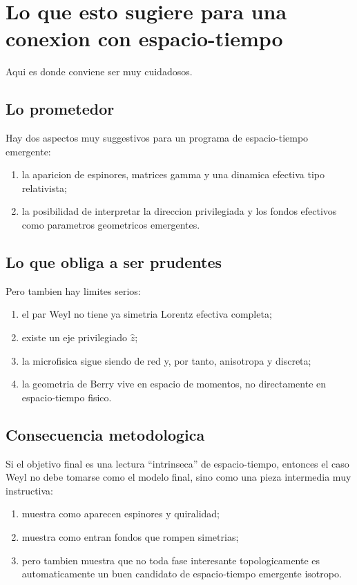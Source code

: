 \section{Lo que esto sugiere para una conexion con espacio-tiempo}
Aqui es donde conviene ser muy cuidadosos.

\subsection{Lo prometedor}
Hay dos aspectos muy suggestivos para un programa de espacio-tiempo emergente:
\begin{enumerate}[label=\arabic*.]
    \item la aparicion de espinores, matrices gamma y una dinamica efectiva tipo relativista;
    \item la posibilidad de interpretar la direccion privilegiada y los fondos efectivos como parametros geometricos emergentes.
\end{enumerate}

\subsection{Lo que obliga a ser prudentes}
Pero tambien hay limites serios:
\begin{enumerate}[label=\arabic*.]
    \item el par Weyl no tiene ya simetria Lorentz efectiva completa;
    \item existe un eje privilegiado \(\hat{z}\);
    \item la microfisica sigue siendo de red y, por tanto, anisotropa y discreta;
    \item la geometria de Berry vive en espacio de momentos, no directamente en espacio-tiempo fisico.
\end{enumerate}

\subsection{Consecuencia metodologica}
Si el objetivo final es una lectura \enquote{intrinseca} de espacio-tiempo, entonces el caso Weyl no debe tomarse como el modelo final, sino como una pieza intermedia muy instructiva:
\begin{enumerate}[label=\arabic*.]
    \item muestra como aparecen espinores y quiralidad;
    \item muestra como entran fondos que rompen simetrias;
    \item pero tambien muestra que no toda fase interesante topologicamente es automaticamente un buen candidato de espacio-tiempo emergente isotropo.
\end{enumerate}

